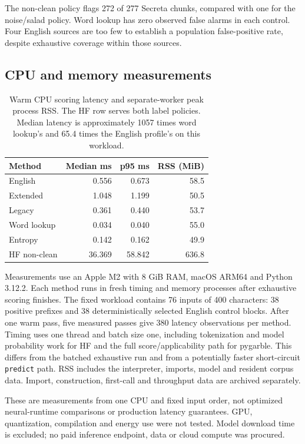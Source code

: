 \documentclass[10pt,a4paper,twocolumn]{article}
\begin{document}
The non-clean policy flags 272 of 277 Secreta chunks, compared with one
for the noise/salad policy. Word lookup has zero observed false alarms
in each control. Four English sources are too few to establish a
population false-positive rate, despite exhaustive coverage within those
sources.

\subsection{CPU and memory
measurements}\label{cpu-and-memory-measurements}

\begin{table}[htbp]
\centering
\small
\caption{Warm CPU scoring latency and separate-worker peak process RSS. The HF
row serves both label policies. Median latency is approximately 1057
times word lookup's and 65.4 times the English profile's on this
workload.}
\begin{tabular}{@{}lrrr@{}}
\toprule
Method & Median ms & p95 ms & RSS (MiB) \\
\midrule
English & 0.556 & 0.673 & 58.5 \\
Extended & 1.048 & 1.199 & 50.5 \\
Legacy & 0.361 & 0.440 & 53.7 \\
Word lookup & 0.034 & 0.040 & 55.0 \\
Entropy & 0.142 & 0.162 & 49.9 \\
HF non-clean & 36.369 & 58.842 & 636.8 \\
\bottomrule
\end{tabular}
\end{table}

Measurements use an Apple M2 with 8 GiB RAM, macOS ARM64 and Python
3.12.2. Each method runs in fresh timing and memory processes after
exhaustive scoring finishes. The fixed workload contains 76 inputs of
400 characters: 38 positive prefixes and 38 deterministically selected
English control blocks. After one warm pass, five measured passes give
380 latency observations per method. Timing uses one thread and batch
size one, including tokenization and model probability work for HF and
the full score/applicability path for pygarble. This differs from the
batched exhaustive run and from a potentially faster short-circuit
\texttt{predict} path. RSS includes the interpreter, imports, model and
resident corpus data. Import, construction, first-call and throughput
data are archived separately.

These are measurements from one CPU and fixed input order, not optimized
neural-runtime comparisons or production latency guarantees. GPU,
quantization, compilation and energy use were not tested. Model download
time is excluded; no paid inference endpoint, data or cloud compute was
procured.
\end{document}
